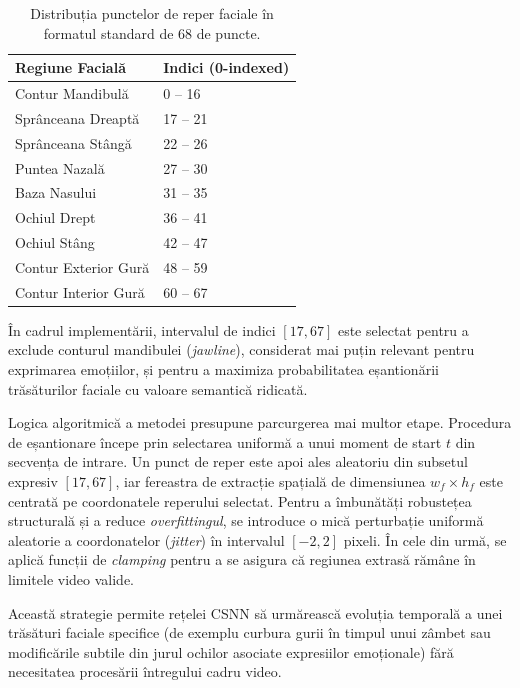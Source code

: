 \begin{table}[h]
	\centering
	\caption{Distribuția punctelor de reper faciale în formatul standard de 68 de puncte.}
	\label{tab:landmarks}
	\begin{tabular}{|l|l|}
		\hline
		\textbf{Regiune Facială} & \textbf{Indici (0-indexed)} \\ \hline
		Contur Mandibulă         & 0 -- 16                     \\ \hline
		Sprânceana Dreaptă       & 17 -- 21                    \\ \hline
		Sprânceana Stângă        & 22 -- 26                    \\ \hline
		Puntea Nazală            & 27 -- 30                    \\ \hline
		Baza Nasului             & 31 -- 35                    \\ \hline
		Ochiul Drept             & 36 -- 41                    \\ \hline
		Ochiul Stâng             & 42 -- 47                    \\ \hline
		Contur Exterior Gură     & 48 -- 59                    \\ \hline
		Contur Interior Gură     & 60 -- 67                    \\ \hline
	\end{tabular}
\end{table}

În cadrul implementării, intervalul de indici $[17, 67]$ este selectat pentru a exclude conturul mandibulei (\textit{jawline}), considerat mai puțin relevant pentru exprimarea emoțiilor, și pentru a maximiza probabilitatea eșantionării trăsăturilor faciale cu valoare semantică ridicată.

Logica algoritmică a metodei presupune parcurgerea mai multor etape. Procedura de eșantionare începe prin selectarea uniformă a unui moment de start $t$ din secvența de intrare. Un punct de reper este apoi ales aleatoriu din subsetul expresiv $[17, 67]$, iar fereastra de extracție spațială de dimensiunea $w_f \times h_f$ este centrată pe coordonatele reperului selectat. Pentru a îmbunătăți robustețea structurală și a reduce \textit{overfittingul}, se introduce o mică perturbație uniformă aleatorie a coordonatelor (\textit{jitter}) în intervalul $[-2, 2]$ pixeli. În cele din urmă, se aplică funcții de \textit{clamping } pentru a se asigura că regiunea extrasă rămâne în limitele video valide.

Această strategie permite rețelei CSNN să urmărească evoluția temporală a unei trăsături faciale specifice (de exemplu curbura gurii în timpul unui zâmbet sau modificările subtile din jurul ochilor asociate expresiilor emoționale) fără necesitatea procesării întregului cadru video.

